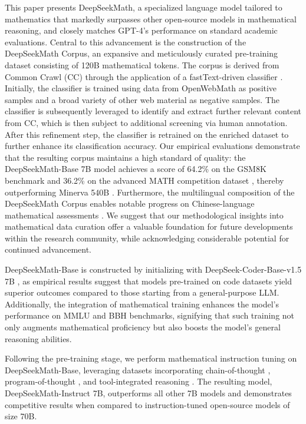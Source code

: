 This paper presents DeepSeekMath, a specialized language model tailored to mathematics that markedly surpasses other open-source models in mathematical reasoning, and closely matches GPT-4’s performance on standard academic evaluations. Central to this advancement is the construction of the DeepSeekMath Corpus, an expansive and meticulously curated pre-training dataset consisting of 120B mathematical tokens. The corpus is derived from Common Crawl (CC) through the application of a fastText-driven classifier \citep{joulin2016fasttext}. Initially, the classifier is trained using data from OpenWebMath \citep{openwebmath} as positive samples and a broad variety of other web material as negative samples. The classifier is subsequently leveraged to identify and extract further relevant content from CC, which is then subject to additional screening via human annotation. After this refinement step, the classifier is retrained on the enriched dataset to further enhance its classification accuracy. Our empirical evaluations demonstrate that the resulting corpus maintains a high standard of quality: the DeepSeekMath-Base 7B model achieves a score of 64.2\% on the GSM8K benchmark \citep{gsm8k} and 36.2\% on the advanced MATH competition dataset \citep{MATH}, thereby outperforming Minerva 540B \citep{minerva}. Furthermore, the multilingual composition of the DeepSeekMath Corpus enables notable progress on Chinese-language mathematical assessments \citep{wei2023cmath,agieval}. We suggest that our methodological insights into mathematical data curation offer a valuable foundation for future developments within the research community, while acknowledging considerable potential for continued advancement.

DeepSeekMath-Base is constructed by initializing with DeepSeek-Coder-Base-v1.5 7B \citep{deepseek-coder}, as empirical results suggest that models pre-trained on code datasets yield superior outcomes compared to those starting from a general-purpose LLM. Additionally, the integration of mathematical training enhances the model's performance on MMLU \citep{mmlu} and BBH \citep{bbh} benchmarks, signifying that such training not only augments mathematical proficiency but also boosts the model's general reasoning abilities.

Following the pre-training stage, we perform mathematical instruction tuning on DeepSeekMath-Base, leveraging datasets incorporating chain-of-thought \citep{cot}, program-of-thought \citep{pot,pal}, and tool-integrated reasoning \citep{tora}. The resulting model, DeepSeekMath-Instruct 7B, outperforms all other 7B models and demonstrates competitive results when compared to instruction-tuned open-source models of size 70B.


